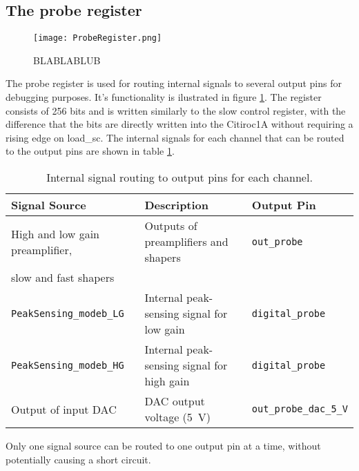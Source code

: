 \subsection{The probe register}
\begin{figure}[h]
    \centering
    \texttt{[image: ProbeRegister.png]}
    \caption{BLABLABLUB\autocite{datasheetCITIROC}}
    \label{fig:CITIROC1A_proberegiseter}
\end{figure}
The probe register is used for routing internal signals to several output pins for debugging purposes.
It's functionality is ilustrated in figure \ref{fig:CITIROC1A_proberegiseter}.
The register consists of 256 bits and is written similarly to the slow control register,
 with the difference that the bits are directly written into the Citiroc1A without requiring a rising edge on load\_sc.
\newline
The internal signals for each channel that can be routed to the output pins are shown in table \ref{tab:probe_register}. 
 \begin{table}[h!]
    \centering
    \begin{tabular}{@{}lll@{}}
    \toprule
    \textbf{Signal Source} & \textbf{Description}                   & \textbf{Output Pin}        \\ \midrule
    High and low gain preamplifier, & Outputs of preamplifiers and shapers & \texttt{out\_probe}        \\
    slow and fast shapers                                                   &                          \\ \midrule
    \texttt{PeakSensing\_modeb\_LG} & Internal peak-sensing signal for low gain & \texttt{digital\_probe}    \\
    \texttt{PeakSensing\_modeb\_HG} & Internal peak-sensing signal for high gain & \texttt{digital\_probe}    \\ \midrule
    Output of input DAC            & DAC output voltage (\SI{5}{\volt})  & \texttt{out\_probe\_dac\_5\_V} \\ \bottomrule
    \end{tabular}
    \caption{Internal signal routing to output pins for each channel.}
    \label{tab:probe_register}
\end{table}
\newline
Only one signal source can be routed to one output pin at a time, without potentially causing a short circuit.








 

